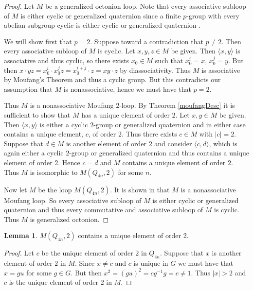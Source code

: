 \documentclass[12pt, twoside, openright]{report}
\theoremstyle{definition}
\newtheorem{lem}[thm]{Lemma}
\begin{document}
\begin{proof}
	Let $M$ be a generalized octonion loop. Note that every associative subloop of $M$ is either cyclic or
    generalized quaternion since a finite $p$-group with every abelian subgroup cyclic is either cyclic or
    generalized quaternion \cite{Cartan}.

	We will show first that $p = 2$. Suppose toward a contradiction that $p\neq 2$. Then every associative
    subloop of $M$ is cyclic. Let $x, y, z\in M$ be given. Then $\langle x, y\rangle$ is associative and
    thus cyclic, so there exists $x_0\in M$ such that $x_0^i = x$, $x_0^j = y$. But then
    $x\cdot yz = x_0^i\cdot x_0^jz = x_0^{i + j}\cdot z = xy\cdot z$ by diassociativity. Thus $M$ is
    associative by Moufang's Theorem and thus a cyclic group. But this contradicts our assumption that
    $M$ is nonassociative, hence we must have that $p = 2$.

	Thus $M$ is a nonassociative Moufang $2$-loop. By Theorem \ref{moufangDesc} it is sufficient to show
    that $M$ has a unique element of order $2$. Let $x, y\in M$ be given. Then $\langle x, y\rangle$ is
    either a cyclic $2$-group or generalized quaternion and in either case contains a unique element,
    $c$, of order $2$. Thus there exists $c\in M$ with $|c| = 2$. Suppose that $d\in M$ is another
    element of order $2$ and consider $\langle c, d\rangle$, which is again either a cyclic $2$-group or
    generalized quaternion and thus contains a unique element of order $2$. Hence $c = d$ and $M$ contains
    a unique element of order $2$. Thus $M$ is isomorphic to $M(Q_{4n}, 2)$ for some $n$.

  Now let $M$ be the loop $M(Q_{4n}, 2)$. It is shown in \cite{Chein} that $M$ is a nonassociative Moufang
    loop. So every associative subloop of $M$ is either cyclic or generalized quaternion and thus every
    commutative and associative subloop of $M$ is cyclic. Thus $M$ is generalized octonion.
\end{proof}

\begin{lem}
  $M(Q_{4n}, 2)$ contains a unique element of order $2$.
\end{lem}

\begin{proof}
  Let $c$ be the unique element of order $2$ in $Q_{4n}$. Suppose that $x$ is another element of
    order $2$ in $M$. Since $x\neq c$ and $c$ is unique in $G$ we must have that $x = gu$ for some
    $g\in G$. But then $x^2 = (gu)^2 = c g^{-1}g = c\neq 1$. Thus $|x| > 2$ and $c$ is the unique
    element of order $2$ in $M$.
\end{proof}
\end{document}
